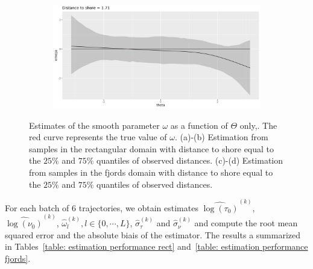 \documentclass[11pt]{article}
\newcommand {\1}{\mathbb{1}}
\begin{document}
\begin{figure}[H]
\begin{subfigure}{0.48\textwidth}
	\caption{}
\end{subfigure}
\begin{subfigure}{0.48\textwidth}
	\centering
	\includegraphics[scale=0.3]{images/simulation study/fe_crcvm_fjords_hf_ne1_omega_theta_q2_ExpShore .png}
	\caption{}
\end{subfigure}
	\caption{Estimates of the smooth parameter $\omega$ as a function of $\Theta$ only,. The red curve represents the true value of $\omega$. (a)-(b) Estimation from samples in the rectangular domain with distance to shore equal to the $25\%$ and $75\%$ quantiles of observed distances. (c)-(d) Estimation from samples in the fjords domain with distance to shore equal to the $25\%$ and $75\%$ quantiles of observed distances. }
\label{fig: marginal_estimates_CRCVM}
\end{figure}


For each batch of $6$ trajectories, we obtain estimates $\widehat{\log(\tau_0)}^{(k)}$, $\widehat{\log(\nu_0)}^{(k)}$, $\hat{\omega}_l^{(k)}, l \in \{0,\cdots, L\}$, $\hat{\sigma}_{\tau}^{(k)}$ and $\hat{\sigma}_{\nu}^{(k)}$ and compute the root mean squared error and the absolute biais of the estimator. The results a summarized in Tables~\ref{table: estimation performance rect} and~\ref{table: estimation performance fjords}.
\end{document}
